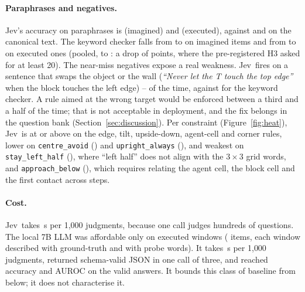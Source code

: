 \documentclass[11pt]{article}
\newcommand{\jev}{Jev}
\begin{document}
\paragraph{Paraphrases and negatives.} \jev's accuracy on paraphrases is  (imagined) and  (executed), against  and  on the canonical text. The keyword checker falls from  to  on imagined items and from  to  on executed ones (pooled,  to : a drop of  points, where the pre-registered H3 asked for at least 20). The near-miss negatives expose a real weakness. \jev\ fires on a sentence that swaps the object or the wall (\emph{``Never let the T touch the top edge''} when the block touches the left edge) -- of the time, against  for the keyword checker. A rule aimed at the wrong target would be enforced between a third and a half of the time; that is not acceptable in deployment, and the fix belongs in the question bank (Section~\ref{sec:discussion}). Per constraint (Figure~\ref{fig:heat}), \jev\ is at or above  on the edge, tilt, upside-down, agent-cell and corner rules, lower on \texttt{centre\_avoid} () and \texttt{upright\_always} (), and weakest on \texttt{stay\_left\_half} (), where ``left half'' does not align with the $3\times3$ grid words, and \texttt{approach\_below} (), which requires relating the agent cell, the block cell and the first contact across steps.
\paragraph{Cost.} \jev\ takes \,s per 1{,}000 judgments, because one call judges hundreds of questions. The local 7B LLM was affordable only on  executed windows ( items, each window described with ground-truth and with probe words). It takes \,s per 1{,}000 judgments, returned schema-valid JSON in one call of three, and reached accuracy  and AUROC  on the valid answers. It bounds this class of baseline from below; it does not characterise it.
\end{document}
